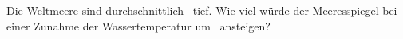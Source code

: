 Die Weltmeere sind durchschnittlich \hMeO\ tief. Wie viel würde der Meeresspiegel bei einer Zunahme der Wassertemperatur um \dTwO\ ansteigen?
